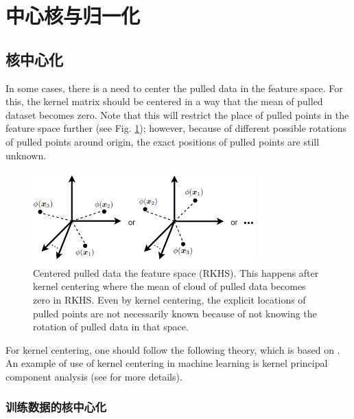\documentclass[lang=cn,10pt]{gorgeousnbook}
\numberwithin{equation}{section}%
\numberwithin{figure}{section}%
\begin{document}
\section{中心核与归一化}\label{section_kernel_centering_normalization}

\subsection{核中心化} \label{section_kernel_centering}

In some cases, there is a need to center the pulled data in the feature space. For this, the kernel matrix should be centered in a way that the mean of pulled dataset becomes zero. Note that this will restrict the place of pulled points in the feature space further (see Fig. \ref{figure_centered_pulled_data}); however, because of different possible rotations of pulled points around origin, the exact positions of pulled points are still unknown. 

\begin{figure}[!t]
\centering
\includegraphics[width=3.4in]{./images/centered_pulled_data}
\caption{Centered pulled data the feature space (RKHS). This happens after kernel centering where the mean of cloud of pulled data becomes zero in RKHS. Even by kernel centering, the explicit locations of pulled points are not necessarily known because of not knowing the rotation of pulled data in that space.}
\label{figure_centered_pulled_data}
\end{figure}

For kernel centering, one should follow the following theory, which is based on \cite{scholkopf1997kernel}. An example of use of kernel centering in machine learning is kernel principal component analysis (see \cite{ghojogh2019unsupervised} for more details). 


\subsubsection{训练数据的核中心化}
\end{document}
